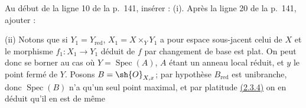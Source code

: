 Au début de la ligne 10 de la p.~141, insérer : (i). Après la ligne 20
de la p.~141, ajouter :

\smallskip
\noindent
\textup{(ii)} Notons que si $Y_1=Y_{\mathrm{red}}$,
$X_1=X\times_Y Y_1$ a pour espace sous-jacent celui de $X$ et le
morphisme $f_1:X_1\to Y_1$ déduit de $f$ par changement de base est
plat. On peut donc se borner au cas où $Y=\operatorname{Spec}(A)$,
$A$ étant un anneau local réduit, et $y$ le point fermé de $Y$. Posons
$B=\sh{O}_{X,x}$; par hypothèse $B_{\mathrm{red}}$ est unibranche, donc
$\operatorname{Spec}(B)$ n'a qu'un seul point maximal, et par platitude
{\hyperref[canon-index.ega4.c04.prop.2-3-4]{(2.3.4)}} on en déduit qu'il en est de
même

